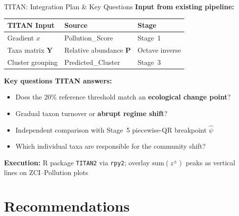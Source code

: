 \documentclass[aspectratio=169, 11pt]{beamer}
\newcommand{\hl}[1]{\textcolor{TRUblue}{\textbf{#1}}}
\newcommand{\code}[1]{\texttt{\small #1}}
\newcommand{\mat}[1]{\mathbf{#1}}
\begin{document}
\begin{frame}{TITAN: Integration Plan \& Key Questions}
  \textbf{Input from existing pipeline:}
  \begin{center}\small
  \begin{tabular}{lll}
    \toprule
    TITAN Input & Source & Stage \\
    \midrule
    Gradient $x$           & Pollution\_Score        & Stage~1 \\
    Taxa matrix $\mat{Y}$  & Relative abundance $\mat{P}$     & Octave inverse \\
    Cluster grouping       & Predicted\_Cluster      & Stage~3 \\
    \bottomrule
  \end{tabular}
  \end{center}

  \vspace{0.3em}
  \textbf{Key questions TITAN answers:}
  \begin{itemize}
    \item Does the 20\% reference threshold match an \hl{ecological change point}?
    \item Gradual taxon turnover or \hl{abrupt regime shift}?
    \item Independent comparison with Stage~5 piecewise-QR breakpoint $\hat\psi$
    \item Which individual taxa are responsible for the community shift?
  \end{itemize}

  \vspace{0.3em}
  \textbf{Execution:} R package \code{TITAN2} via \code{rpy2};
  overlay $\mathrm{sum}(z^{\pm})$ peaks as vertical lines on ZCI--Pollution plots
\end{frame}


\section{Recommendations}
\end{document}
